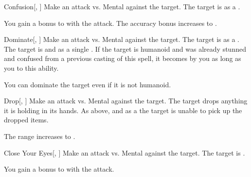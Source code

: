 \lowercase{\hypertarget{spell:Confusion}{}}\label{spell:Confusion}
\begin{freeability}[Rank 5]{\hypertarget{spell:Confusion}{Confusion}}[, ]
Make an attack vs. Mental against the target.
\hit The target is \confused as a .

\rankline
{} You gain a  bonus to  with the attack.
 The accuracy bonus increases to .
\end{freeability}
\vspace{0.25em}



\lowercase{\hypertarget{spell:Dominate}{}}\label{spell:Dominate}
\begin{freeability}[Rank 5]{\hypertarget{spell:Dominate}{Dominate}}[, ]
Make an attack vs. Mental against the target.
\hit The target is  as a .
\crit The target is  and  as a single .
If the target is humanoid and was already stunned and confused from a previous casting of this spell, it becomes  by you as long as you  to this ability.

\rankline
{} You can dominate the target even if it is not humanoid.
\end{freeability}
\vspace{0.25em}



\lowercase{\hypertarget{spell:Drop}{}}\label{spell:Drop}
\begin{freeability}[Rank 5]{\hypertarget{spell:Drop}{Drop}}[, ]
Make an attack vs. Mental against the target.
\hit The target drops anything it is holding in its hands.
\crit As above, and as a  the target is unable to pick up the dropped items.

\rankline
{} The range increases to \rnglong.
\end{freeability}
\vspace{0.25em}



\lowercase{\hypertarget{spell:Close Your Eyes}{}}\label{spell:Close Your Eyes}
\begin{freeability}[Rank 6]{\hypertarget{spell:Close Your Eyes}{Close Your Eyes}}[, ]
Make an attack vs. Mental against the target.
\hit The target is .

\rankline
{} You gain a  bonus to  with the attack.
\end{freeability}
\vspace{0.25em}



